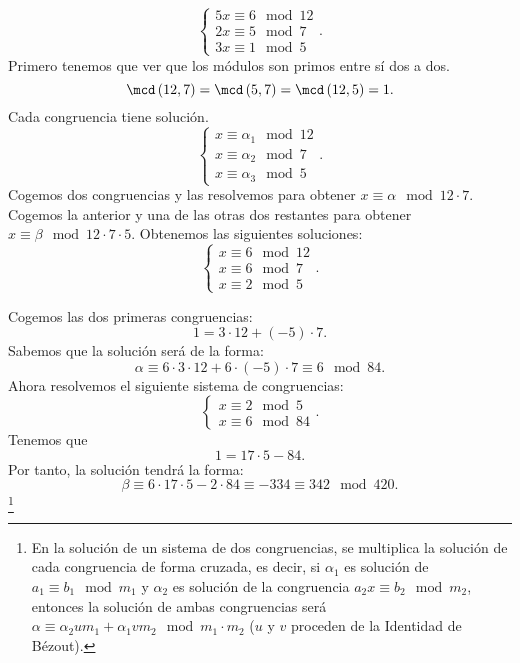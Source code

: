 \begin{eg}
\normalfont 
\[
\begin{cases}
5x \equiv 6 \mod 12 \\
2x \equiv 5 \mod 7 \\
3x \equiv 1 \mod 5
\end{cases}
.\]
Primero tenemos que ver que los módulos son primos entre sí dos a dos. 
\[\mcd\left(12,7\right) = \mcd\left(5,7\right)=\mcd\left(12,5\right) = 1 .\]
Cada congruencia tiene solución. 
\[
\begin{cases}
x \equiv \alpha_{1} \mod 12 \\
x \equiv \alpha_{2} \mod 7 \\
x \equiv \alpha_{3} \mod 5
\end{cases}
.\]
Cogemos dos congruencias y las resolvemos para obtener $\displaystyle x \equiv \alpha \mod 12 \cdot 7 $. Cogemos la anterior y una de las otras dos restantes para obtener $\displaystyle x \equiv \beta \mod 12 \cdot 7 \cdot 5 $. Obtenemos las siguientes soluciones:
\[
\begin{cases}
x \equiv 6 \mod 12 \\
x \equiv 6 \mod 7 \\
x \equiv 2 \mod 5
\end{cases}
.\]

Cogemos las dos primeras congruencias: 
\[1 = 3 \cdot 12 + \left(-5\right) \cdot 7 .\]
Sabemos que la solución será de la forma:
\[\alpha \equiv 6 \cdot 3 \cdot 12 + 6 \cdot \left(-5\right) \cdot 7 \equiv 6 \mod 84 .\]
Ahora resolvemos el siguiente sistema de congruencias:
\[
\begin{cases}
x \equiv 2 \mod 5 \\
x \equiv 6 \mod 84
\end{cases}
.\]
Tenemos que 
\[1 = 17 \cdot 5 - 84 .\]
Por tanto, la solución tendrá la forma:
\[\beta \equiv 6 \cdot 17 \cdot 5 - 2 \cdot 84 \equiv -334 \equiv 342 \mod 420 .\]
\footnote{En la solución de un sistema de dos congruencias, se multiplica la solución de cada congruencia de forma cruzada, es decir, si $\displaystyle \alpha_{1} $ es solución de $\displaystyle a_{1} \equiv b_{1} \mod m_{1} $ y $\displaystyle \alpha_{2} $ es solución de la congruencia $\displaystyle a_{2} x \equiv b_{2} \mod m_{2} $, entonces la solución de ambas congruencias será $\displaystyle \alpha \equiv \alpha_{2}um_{1} + \alpha_{1}vm_{2} \mod m_{1} \cdot m_{2} $ ($\displaystyle u $ y $\displaystyle v $ proceden de la Identidad de Bézout).}
\end{eg}


